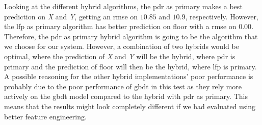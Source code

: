 Looking at the different hybrid algorithms, the \gls{pdr} as primary makes a best prediction on \textit{X} and \textit{Y}, getting an \gls{rmse} on $10.85$ and $10.9$, respectively. However, the \gls{lfp} as primary algorithm has better prediction on floor with a \gls{rmse} on $0.00$. 
Therefore, the \gls{pdr} as primary hybrid algorithm is going to be the algorithm that we choose for our system. However, a combination of two hybrids would be optimal, where the prediction of \textit{X} and \textit{Y} will be the hybrid, where \gls{pdr} is primary and the prediction of floor will then be the hybrid, where \gls{lfp} is primary. A possible reasoning for the other hybrid implementations' poor performance is probably due to the poor performance of \gls{gbdt} in this test as they rely more actively on the \gls{gbdt} model compared to the hybrid with \gls{pdr} as primary. This means that the results might look completely different if we had evaluated using better feature engineering.

\begin{table}[H]
    \centering
    \caption{Overview over performances of indoor position estimation methods.}
    \label{tab:alg_performances}
\end{table}
